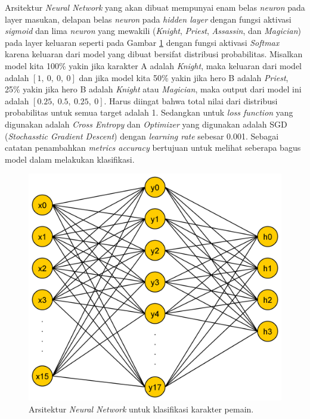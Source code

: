 Arsitektur \textit{Neural Network} yang akan dibuat mempunyai enam belas \textit{neuron} pada layer masukan, delapan belas \textit{neuron} pada \textit{hidden layer} dengan fungsi aktivasi \textit{sigmoid} dan lima \textit{neuron} yang mewakili (\textit{Knight}, \textit{Priest}, \textit{Assassin}, dan \textit{Magician}) pada layer keluaran seperti pada Gambar \ref{fig:nn_player} dengan fungsi aktivasi \textit{Softmax} karena keluaran dari model yang dibuat bersifat distribusi probabilitas. Misalkan model kita 100\% yakin jika karakter A adalah \textit{Knight}, maka keluaran dari model adalah $\left[1,\ 0,\ 0,\ 0 \right]$ dan jika model kita 50\% yakin jika hero B adalah \textit{Priest}, 25\% yakin jika hero B adalah \textit{Knight} atau \textit{Magician}, maka output dari model ini adalah $\left[0.25,\ 0.5,\ 0.25, \ 0 \right]$. Harus diingat bahwa total nilai dari distribusi probabilitas untuk semua target adalah 1. Sedangkan untuk \textit{loss function} yang digunakan adalah \textit{Cross Entropy} dan \textit{Optimizer} yang digunakan adalah SGD (\textit{Stochasstic Gradient Descent}) dengan \textit{learning rate} sebesar 0.001. Sebagai catatan penambahkan \textit{metrics accuracy} bertujuan untuk melihat seberapa bagus model dalam melakukan klasifikasi.
\vspace{1ex}

\begin{figure} [!h] \centering
	\includegraphics[scale=0.07]{img/nn_player_character.png}
	\caption{Arsitektur \textit{Neural Network} untuk klasifikasi karakter pemain.}
	\label{fig:nn_player}
\end{figure}


